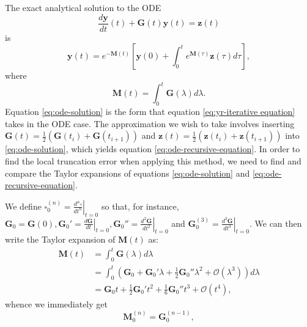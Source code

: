 The exact analytical solution to the ODE
\begin{equation}\label{eq:ode-appendix}
    \frac{d\mathbf{y}}{dt}(t) + \mathbf{G}(t)\mathbf{y}(t) = \mathbf{z}(t) 
\end{equation}
is 
\begin{equation}\label{eq:ode-solution}
    \mathbf{y}(t) = e^{-\mathbf{M}(t)}\left[\mathbf{y}(0) + \int_0^t e^{\mathbf{M}(\tau)}\mathbf{z}(\tau) d\tau \right],
\end{equation}
where 
\begin{equation}
    \mathbf{M}(t) = \int_0^t \mathbf{G}(\lambda) d\lambda.
\end{equation}
Equation \ref{eq:ode-solution} is the form that equation \ref{eq:yr-iterative equation} takes in the ODE case. The approximation we wish to take involves inserting $\mathbf{G}(t) = \frac{1}{2}(\mathbf{G}(t_i)+\mathbf{G}(t_{i+1}))$ and $\mathbf{z}(t) = \frac{1}{2}(\mathbf{z}(t_i)+\mathbf{z}(t_{i+1}))$ into \ref{eq:ode-solution}, which yields equation \ref{eq:ode-recursive-equation}. In order to find the local truncation error when applying this method, we need to find and compare the Taylor expansions of equations \ref{eq:ode-solution} and \ref{eq:ode-recursive-equation}. 

We define $\square_0^{(n)} = \left.\frac{d^{n}\square}{dt^n}\right|_{t=0}$ so that, for instance, $\mathbf{G}_0 = \mathbf{G}(0), \mathbf{G}_0' = \left. \frac{d\mathbf{G}}{dt}\right|_{t=0}, \mathbf{G}_0'' = \left. \frac{d^2\mathbf{G}}{dt^2}\right|_{t=0}$ and $\mathbf{G}_0^{(3)} = \left. \frac{d^3\mathbf{G}}{dt^3}\right|_{t=0}$. We can then write the Taylor expansion of $\mathbf{M}(t)$ as:
\begin{equation}
\begin{split}
    \mathbf{M}(t) & = \int_{0}^t \mathbf{G}(\lambda) d \lambda \\
    & = \int_{0}^t \left(\mathbf{G}_0 +\mathbf{G}_0'\lambda +\frac{1}{2}\mathbf{G}_0''\lambda^2 + \mathcal{O}(\lambda^3) \right)d \lambda \\
    & = \mathbf{G}_0t + \frac{1}{2}\mathbf{G}_0't^2+\frac{1}{6}\mathbf{G}_0''t^3 + \mathcal{O}(t^4),     
\end{split}
\end{equation}
whence we immediately get 
\begin{equation}
    \mathbf{M}_0^{(n)} = \mathbf{G}_0^{(n-1)},
\end{equation}


